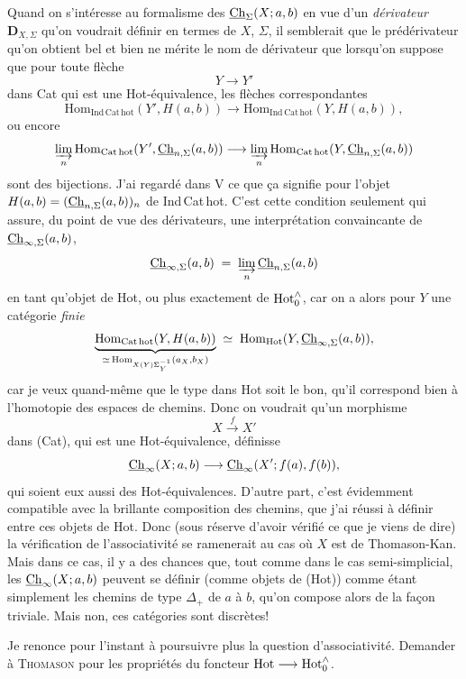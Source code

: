Quand on s'intéresse au formalisme des $\underline{\mathrm{Ch}}_\Sigma(X;a,b)$ en vue d'un \textit{dérivateur} $\mathbf{D}_{X,\Sigma}$ qu'on voudrait définir en termes de $X$, $\Sigma$, il semblerait que le prédérivateur qu'on obtient bel et bien ne mérite le nom de dérivateur que lorsqu'on suppose que pour toute flèche
\[ Y\longrightarrow Y' \]
dans Cat qui est une Hot-équivalence, les flèches correspondantes
\[ \mathrm{Hom}_{\mathrm{Ind\,Cat\,hot}}(Y',H(a,b)) \longrightarrow \mathrm{Hom}_{\mathrm{Ind\,Cat\,hot}}(Y,H(a,b)), \]
ou encore
\[ \varinjlim_n \mathrm{Hom}_{\mathrm{Cat\,hot}}(Y',\underline{\mathrm{Ch}}_{n,\Sigma}(a,b)) \longrightarrow \varinjlim_n \mathrm{Hom}_{\mathrm{Cat\,hot}}(Y,\underline{\mathrm{Ch}}_{n,\Sigma}(a,b)) \]
sont des bijections. J'ai regardé dans V ce que ça signifie pour l'objet $H(a,b) = (\underline{\mathrm{Ch}}_{n,\Sigma}(a,b))_n$ de Ind\,Cat\,hot. C'est cette condition seulement qui assure, du point de vue des dérivateurs, une interprétation convaincante de $\underline{\mathrm{Ch}}_{\infty,\Sigma}(a,b)$,
\[ \underline{\mathrm{Ch}}_{\infty,\Sigma}(a,b) \;=\; \varinjlim_n \underline{\mathrm{Ch}}_{n,\Sigma}(a,b) \]
en tant qu'objet de Hot, ou plus exactement de $\mathrm{Hot}^{\wedge}_{0}$, car on a alors pour $Y$ une catégorie \textit{finie}
\[ \underbrace{\mathrm{Hom}_{\mathrm{Cat\,hot}}(Y,H(a,b))}_{\simeq\,\mathrm{Hom}_{X(Y)\Sigma_Y^{-1}}(a_X,b_X)} \;\simeq\; \mathrm{Hom}_{\mathrm{Hot}}(Y,\underline{\mathrm{Ch}}_{\infty,\Sigma}(a,b)), \]
car je veux quand-même que le type dans Hot soit le bon, qu'il correspond bien à l'homotopie des espaces de chemins. Donc on voudrait qu'un morphisme
\[ X\xrightarrow{\;f\;}X' \]
dans (Cat), qui est une Hot-équivalence, définisse
\[ \underline{\mathrm{Ch}}_\infty(X;a,b) \longrightarrow \underline{\mathrm{Ch}}_\infty(X';f(a),f(b)), \]
qui soient eux aussi des Hot-équivalences. D'autre part, c'est évidemment compatible avec la brillante composition des chemins, que j'ai réussi à définir entre ces objets de Hot. Donc (sous réserve d'avoir vérifié ce que je viens de dire) la vérification de l'associativité se ramenerait au cas où $X$ est de Thomason-Kan. Mais dans ce cas, il y a des chances que, tout comme dans le cas semi-simplicial, les $\underline{\mathrm{Ch}}_\infty(X;a,b)$ peuvent se définir (comme objets de (Hot)) comme étant simplement les chemins de type $\Delta_+$ de $a$ à $b$, qu'on compose alors de la façon triviale. Mais non, ces catégories sont discrètes! %

Je renonce pour l'instant à poursuivre plus la question d'associativité. Demander à \textsc{Thomason} pour les propriétés du foncteur $\mathrm{Hot}\longrightarrow\mathrm{Hot}^{\wedge}_{0}$.

\clearpage
{}

